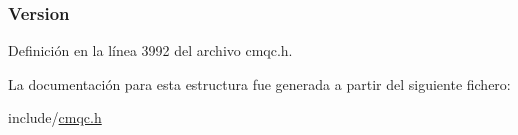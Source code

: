\subsubsection[{Version}]{ Version}\label{structtag_m_q_c_t_l_o_a0656ef8f766b3907d394d88a35d7b7e9}


Definición en la línea 3992 del archivo cmqc.\+h.



La documentación para esta estructura fue generada a partir del siguiente fichero\+:\begin{DoxyCompactItemize}
\item 
include/\hyperlink{cmqc_8h}{cmqc.\+h}\end{DoxyCompactItemize}
